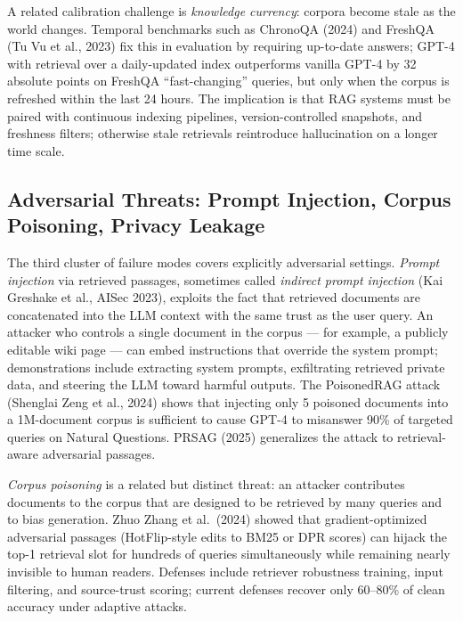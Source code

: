 \documentclass{article}
\begin{document}
A related calibration challenge is \emph{knowledge currency}: corpora become stale as the world changes. Temporal benchmarks such as ChronoQA (2024) and FreshQA (Tu Vu et al., 2023) fix this in evaluation by requiring up-to-date answers; GPT-4 with retrieval over a daily-updated index outperforms vanilla GPT-4 by 32 absolute points on FreshQA ``fast-changing'' queries, but only when the corpus is refreshed within the last 24 hours. The implication is that RAG systems must be paired with continuous indexing pipelines, version-controlled snapshots, and freshness filters; otherwise stale retrievals reintroduce hallucination on a longer time scale.

\subsection{Adversarial Threats: Prompt Injection, Corpus Poisoning, Privacy Leakage}\label{adversarial-threats-prompt-injection-corpus-poisoning-privacy-leakage}

The third cluster of failure modes covers explicitly adversarial settings. \emph{Prompt injection} via retrieved passages, sometimes called \emph{indirect prompt injection} (Kai Greshake et al., AISec 2023), exploits the fact that retrieved documents are concatenated into the LLM context with the same trust as the user query. An attacker who controls a single document in the corpus --- for example, a publicly editable wiki page --- can embed instructions that override the system prompt; demonstrations include extracting system prompts, exfiltrating retrieved private data, and steering the LLM toward harmful outputs. The PoisonedRAG attack (Shenglai Zeng et al., 2024) shows that injecting only 5 poisoned documents into a 1M-document corpus is sufficient to cause GPT-4 to misanswer 90\% of targeted queries on Natural Questions. PRSAG (2025) generalizes the attack to retrieval-aware adversarial passages.

\emph{Corpus poisoning} is a related but distinct threat: an attacker contributes documents to the corpus that are designed to be retrieved by many queries and to bias generation. Zhuo Zhang et al.~(2024) showed that gradient-optimized adversarial passages (HotFlip-style edits to BM25 or DPR scores) can hijack the top-1 retrieval slot for hundreds of queries simultaneously while remaining nearly invisible to human readers. Defenses include retriever robustness training, input filtering, and source-trust scoring; current defenses recover only 60--80\% of clean accuracy under adaptive attacks.
\end{document}
